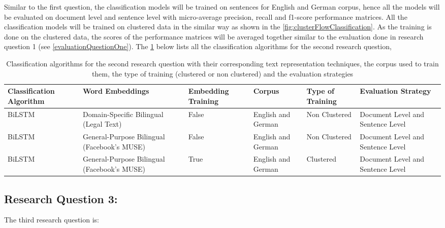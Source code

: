 Similar to the first question, the classification models will be trained on sentences for English and German corpus, hence all the models will be evaluated on document level and sentence level with micro-average precision, recall and f1-score performance matrices. All the classification models will be trained on clustered data in the similar way as shown in the  \ref{fig:clusterFlowClassification}. As the training is done on the clustered data, the scores of the performance matrices will be averaged together similar to the evaluation done in research question 1 (see \ref{evaluationQuestionOne}).
\clearpage
The \ref{table:ListQuestionSecondQuestion} below lists all the classification algorithms for the second research question,
\begin{table}[!ht]
\begin{tabular}{>{\centering\arraybackslash}m{2cm}>{\centering\arraybackslash}m{2.9cm}>{\centering\arraybackslash}m{1.8cm}>{\centering\arraybackslash}m{2cm}>{\centering\arraybackslash}m{1.9cm}>{\centering\arraybackslash}m{2cm}}
\hline
\textbf{Classification Algorithm} & \textbf{Word Embeddings} & \textbf{Embedding Training} & \textbf{Corpus} & \textbf{Type of Training} & \textbf{Evaluation Strategy} \\ \hline
\gls{BiLSTM} & Domain-Specific Bilingual (Legal Text) & False & English and German & Non Clustered & Document Level and Sentence Level \\ [0.2cm]
\gls{BiLSTM} & General-Purpose Bilingual (Facebook's MUSE) & False & English and German & Non Clustered & Document Level and Sentence Level \\ [0.2cm]
\gls{BiLSTM} & General-Purpose Bilingual (Facebook's MUSE) & True & English and German & Clustered & Document Level and Sentence Level \\ \hline
\end{tabular}
\captionsetup{justification=centering,margin=1cm}
\caption{Classification algorithms for the second research question with their corresponding text representation techniques, the corpus used to train them, the type of training (clustered or non clustered) and the evaluation strategies}
\label{table:ListQuestionSecondQuestion}
\end{table}

\subsection{Research Question 3:} \label{question3}

The third research question is:

